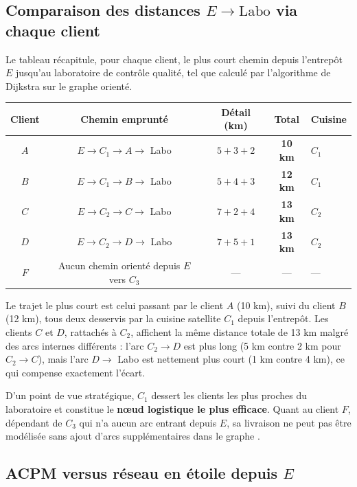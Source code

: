 \documentclass[12pt,a4paper]{article}
\begin{document}
\subsection{Comparaison des distances $E \to \text{Labo}$ via chaque client}

Le tableau récapitule, pour chaque client, le plus court chemin depuis l'entrepôt $E$
jusqu'au laboratoire de contrôle qualité, tel que calculé par l'algorithme de Dijkstra
sur le graphe orienté.

\begin{center}\small
\begin{tabular}{ccccl}
\toprule
\textbf{Client} & \textbf{Chemin emprunté} & \textbf{Détail (km)} & \textbf{Total} & \textbf{Cuisine}\\
\midrule
$A$ & $E\to C_1\to A\to$ Labo & $5+3+2$ & \textbf{10 km} & $C_1$\\
$B$ & $E\to C_1\to B\to$ Labo & $5+4+3$ & \textbf{12 km} & $C_1$\\
$C$ & $E\to C_2\to C\to$ Labo & $7+2+4$ & \textbf{13 km} & $C_2$\\
$D$ & $E\to C_2\to D\to$ Labo & $7+5+1$ & \textbf{13 km} & $C_2$\\
$F$ & Aucun chemin orienté depuis $E$ vers $C_3$ & — & — & —\\
\bottomrule
\end{tabular}
\end{center}

Le trajet le plus court est celui passant par le client $A$ (10 km), suivi du client $B$
(12 km), tous deux desservis par la cuisine satellite $C_1$ depuis l'entrepôt. Les clients
$C$ et $D$, rattachés à $C_2$, affichent la même distance totale de 13 km malgré des
arcs internes différents : l'arc $C_2 \to D$ est plus long (5 km contre 2 km pour
$C_2 \to C$), mais l'arc $D \to$ Labo est nettement plus court (1 km contre 4 km), ce
qui compense exactement l'écart.

D'un point de vue stratégique, $C_1$ dessert les clients les plus proches du laboratoire
et constitue le \textbf{nœud logistique le plus efficace}. Quant au client $F$, dépendant
de $C_3$ qui n'a aucun arc entrant depuis $E$, sa livraison ne peut pas être modélisée
sans ajout d'arcs supplémentaires dans le graphe \cite{cours4GI_graphes}.

\subsection{ACPM versus réseau en étoile depuis $E$}
\end{document}
